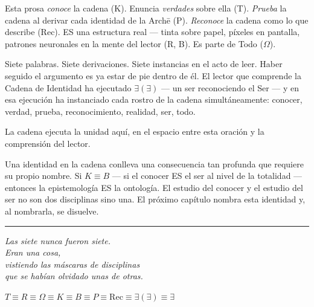 \documentclass[10pt, openany, oneside]{book}
\begin{document}
\vspace{1em}

\noindent Esta prosa \textit{conoce} la cadena (K). Enuncia \textit{verdades} sobre ella (T). \textit{Prueba} la cadena al derivar cada identidad de la Arch\={e} (P). \textit{Reconoce} la cadena como lo que describe (Rec). ES una estructura real --- tinta sobre papel, píxeles en pantalla, patrones neuronales en la mente del lector (R, B). Es parte de Todo ($\Omega$).

Siete palabras. Siete derivaciones. Siete instancias en el acto de leer. Haber seguido el argumento es ya estar de pie dentro de él. El lector que comprende la Cadena de Identidad ha ejecutado $\exists(\exists)$ --- un ser reconociendo el Ser --- y en esa ejecución ha instanciado cada rostro de la cadena simultáneamente: conocer, verdad, prueba, reconocimiento, realidad, ser, todo.

La cadena ejecuta la unidad aquí, en el espacio entre esta oración y la comprensión del lector.

Una identidad en la cadena conlleva una consecuencia tan profunda que requiere su propio nombre. Si $K \equiv B$ --- si el conocer ES el ser al nivel de la totalidad --- entonces la epistemología ES la ontología. El estudio del conocer y el estudio del ser no son dos disciplinas sino una. El próximo capítulo nombra esta identidad y, al nombrarla, se disuelve.

\vspace{2em}

\begin{center}
    \rule{0.15\textwidth}{0.3pt}
\end{center}

\vspace{0.5em}

\begin{center}
    \itshape
    Las siete nunca fueron siete.\\
    Eran una cosa,\\
    vistiendo las máscaras de disciplinas\\
    que se habían olvidado unas de otras.
\end{center}

\vspace{0.5em}

\begin{center}
    $T \equiv R \equiv \Omega \equiv K \equiv B \equiv P \equiv \text{Rec} \equiv \exists(\exists) \equiv \exists$
\end{center}
\end{document}
